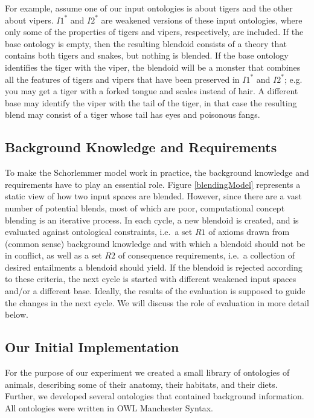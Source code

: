 \documentclass{ecai2012}
\begin{document}
For example, assume one of our input ontologies is about tigers and the other about vipers.
 $I1^*$ and $I2^*$ are weakened versions of these input ontologies, where only some of the 
 properties of tigers and vipers, respectively, are included. If the base ontology is empty, then 
 the resulting blendoid consists of a theory that contains both tigers and snakes, but nothing is blended.
  If the base ontology identifies the tiger with the viper, the blendoid will be a monster that combines all 
  the features of tigers and vipers that have  been preserved in $I1^*$ and $I2^*$; e.g. you may get a tiger 
  with a forked tongue and scales instead of hair. A different base may identify the viper with the tail of the 
  tiger, in that case the resulting blend may consist of a tiger whose tail has eyes and poisonous fangs.

\subsection{Background Knowledge and Requirements}
To make the Schorlemmer model work in practice, the background knowledge 
and requirements have to play an essential role.  Figure \ref{blendingModel} 
represents a static view of how two input spaces are blended. However, since there are a
 vast number of potential blends, most of which are poor, computational concept blending is an iterative process.
  In each cycle, a new blendoid is created, and is evaluated against ontological constraints, i.e.\ a set $R1$ of axioms drawn from (common sense) background knowledge and with which a blendoid should not be in conflict, as well as a set  $R2$ of consequence requirements, i.e.\ a collection of desired entailments a blendoid should yield. If the blendoid is rejected according to these criteria, the next cycle is started with different weakened input spaces and/or a different base.
    Ideally, the results of the evaluation is supposed to guide the changes in the next cycle. %
    We will discuss the role of evaluation in more detail below.



\subsection{Our Initial Implementation}
For the purpose of our experiment we created a small library of ontologies
 of animals, describing some of their anatomy, their habitats, and their diets.
  Further, we developed several ontologies that contained background information. 
  All ontologies were written in OWL Manchester Syntax.
\end{document}
